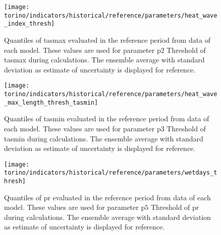\begin{figure}
  \centering
  \texttt{[image: torino/indicators/historical/reference/parameters/heat\_wave\_index\_thresh]}
  \caption{Quantiles of \gls{tasmax} evaluated in the reference period from data of each model. These values are used for parameter $\mathrm{p2}$ {Threshold of \gls{tasmax}} during calculations. The ensemble average with standard deviation as estimate of uncertainty is displayed for reference.}
  \label{fig:parameters_heat_wave_index_thresh}
\end{figure}

\begin{figure}
  \centering
  \texttt{[image: torino/indicators/historical/reference/parameters/heat\_wave\_max\_length\_thresh\_tasmin]}
  \caption{Quantiles of \gls{tasmin} evaluated in the reference period from data of each model. These values are used for parameter $\mathrm{p3}$ {Threshold of \gls{tasmin}} during calculations. The ensemble average with standard deviation as estimate of uncertainty is displayed for reference.}
  \label{fig:parameters_heat_wave_max_length_thresh_tasmin}
\end{figure}

\begin{figure}
  \centering
  \texttt{[image: torino/indicators/historical/reference/parameters/wetdays\_thresh]}
  \caption{Quantiles of \gls{pr} evaluated in the reference period from data of each model. These values are used for parameter $\mathrm{p5}$ {Threshold of \gls{pr}} during calculations. The ensemble average with standard deviation as estimate of uncertainty is displayed for reference.}
  \label{fig:parameters_wetdays_thresh}
\end{figure}
